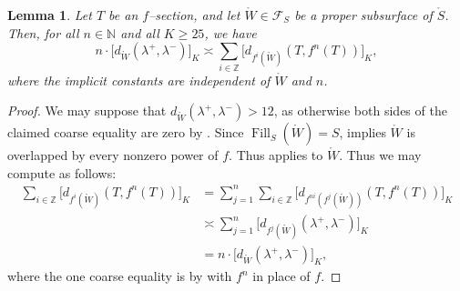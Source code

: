 \documentclass[11pt,letterpaper]{amsart}
\newcommand{\ZZ}[0]{\mathbb{Z}}
\newcommand{\NN}[0]{\mathbb{N}}
\newcommand{\Fill}{\operatorname{Fill}}
\newcommand{\mc}{\mathcal}
\newcommand{\mr}{\mathring}
\newcommand{\psub}{\mr W}
\numberwithin{equation}{section}
\newtheorem{lemma}[theorem]{Lemma}
\theoremstyle{definition}
\begin{document}
\begin{lemma}\label{Lem:PuncturedSum}
Let $T$ be an $f$--section, and let $\psub \in \mc F_S$ be a proper subsurface of $\mr S$. Then, for all $n \in \NN$ and all $K \geq 25$, we have
\[
n \cdot \big[ d_{\psub}(\lambda^+, \lambda^-) \big]_K \asymp \sum_{i \in \ZZ} 
\big[ d_{f^i(\psub)}(T, f^n(T)) \big]_{K},
\]
where the implicit constants are independent of $\psub$ and $n$.
\end{lemma}

\begin{proof}
We may suppose that $d_{\psub}(\lambda^+, \lambda^-) > 12$, as otherwise both sides of the claimed coarse equality are zero by . Since $\Fill_S(\psub) = S$,   implies  $\psub$ is overlapped by every nonzero power of $f$. Thus  applies to $\psub$. Thus we may compute as follows:
\begin{align*}
\sum_{i \in \ZZ} 
\big[ d_{f^i(\psub)}(T, f^n(T)) \big]_{K} 
&= \sum_{j = 1}^{n} \sum_{i \in \ZZ} 
\big[ d_{f^{ni} (f^j (\psub))}(T, f^{n}(T)) \big]_{K} \\
&\asymp \sum_{j = 1}^{n} \big[ d_{f^j(\psub)}(\lambda^+, \lambda^-) \big]_K \\
& = n \cdot \big[ d_{\psub}(\lambda^+, \lambda^-) \big]_K,
\end{align*}
where the one coarse equality is by   with $f^{n}$ in place of $f$.
\end{proof}
\end{document}
